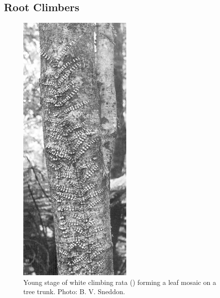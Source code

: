 \subsection{Root Climbers}

\begin{figure}
	\includegraphics[width=0.5\textwidth]{graphics/figure30rata.jpg}
	\centering
	\caption[Young stage of white climbing rata]{Young stage of white climbing rata () forming a leaf mosaic on a tree trunk. Photo: B. V. Sneddon.}
	\label{fig:30rata}
\end{figure}

